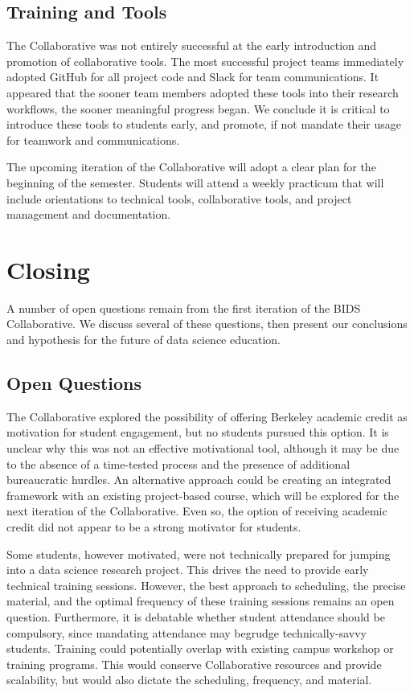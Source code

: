 \documentclass[12pt]{article}
\begin{document}
\subsection{Training and Tools}

The Collaborative was not entirely successful at the early introduction and promotion of collaborative tools.  The most successful project teams immediately adopted GitHub for all project code and Slack for team communications.  It appeared that the sooner team members adopted these tools into their research workflows, the sooner meaningful progress began.  We conclude it is critical to introduce these tools to students early, and promote, if not mandate their usage for teamwork and communications.

The upcoming iteration of the Collaborative will adopt a clear plan for the beginning of the semester. Students will attend a weekly practicum that will include orientations to technical tools, collaborative tools, and project management and documentation.



\section{Closing}

A number of open questions remain from the first iteration of the BIDS Collaborative.  We discuss several of these questions, then present our conclusions and hypothesis for the future of data science education.

\subsection{Open Questions}

The Collaborative explored the possibility of offering Berkeley academic credit as motivation for student engagement, but no students pursued this option. It is unclear why this was not an effective motivational tool, although it may be due to the absence of a time-tested process and the presence of additional bureaucratic hurdles. An alternative approach could be creating an integrated framework with an existing project-based course, which will be explored for the next iteration of the Collaborative.  Even so, the option of receiving academic credit did not appear to be a strong motivator for students.

Some students, however motivated, were not technically prepared for jumping into a data science research project.  This drives the need to provide early technical training sessions.  However, the best approach to scheduling, the precise material, and the optimal frequency of these training sessions remains an open question.  Furthermore, it is debatable whether student attendance should be compulsory, since mandating attendance may begrudge technically-savvy students.  Training could potentially overlap with existing campus workshop or training programs.  This would conserve Collaborative resources and provide scalability, but would also dictate the scheduling, frequency, and material.
\end{document}

